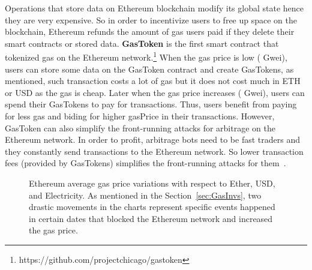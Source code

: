 Operations that store data on Ethereum blockchain modify its global state hence they are very expensive. So in order to incentivize users to free up space on the blockchain, Ethereum refunds the amount of gas users paid if they delete their smart contracts or stored data. \textbf{GasToken} is the first smart contract that tokenized gas on the Ethereum network.\footnote{https://github.com/projectchicago/gastoken} When the gas price is low ( Gwei), users can store some data on the GasToken contract and create GasTokens, as mentioned, such transaction costs a lot of gas but it does not cost much in ETH or USD as the gas is cheap. Later when the gas price increases ( Gwei), users can spend their GasTokens to pay for transactions. Thus, users benefit from paying for less gas and biding for higher \textsf{gasPrice} in their transactions. However, GasToken can also simplify the front-running attacks for arbitrage on the Ethereum network. In order to profit, arbitrage bots need to be fast traders and they constantly send transactions to the Ethereum network. So lower transaction fees (provided by GasTokens) simplifies the front-running attacks for them~\cite{Eskandari2019SoKTD}.


\begin{figure}[!htb]

	\centering
	\hfill
	\caption {Ethereum average gas price variations with respect to Ether, USD, and Electricity. As mentioned in the Section~\ref{sec:GasInvs}, two drastic movements in the charts represent specific events happened in certain dates  that blocked the Ethereum network and increased the gas price.}
	\label{fig:gas}

\end{figure}

